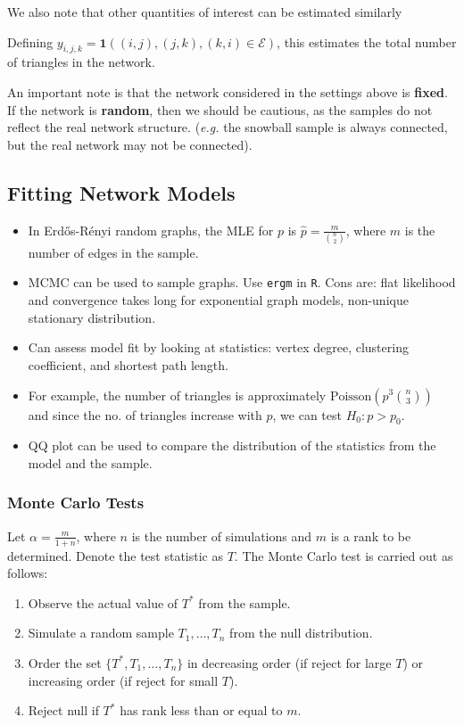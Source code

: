 \documentclass{article}
\begin{document}
We also note that other quantities of interest can be estimated similarly \begin{example}[Triangles]
    Defining $y_{i,j,k}=\mathbf{1}((i,j),(j,k),(k,i)\in \mathcal{E})$, this estimates the total number of triangles in the network.
\end{example}

An important note is that the network considered in the settings above is \textbf{fixed}. If the network is \textbf{random}, then we should be cautious, as the samples do not reflect the real network structure. (\textit{e.g.} the snowball sample is always connected, but the real network may not be connected).  


\subsection{Fitting Network Models}
\begin{itemize}
    \item In Erd\H{o}s-R\'{e}nyi random graphs, the MLE for $p$ is $\hat{p}=\frac{m}{\binom{n}{2}}$, where $m$ is the number of edges in the sample.
    \item MCMC can be used to sample graphs. Use \verb|ergm| in \verb|R|. Cons are: flat likelihood and convergence takes long for exponential graph models, non-unique stationary distribution.
    \item Can assess model fit by looking at statistics: vertex degree, clustering coefficient, and shortest path length.
    \item For example, the number of triangles is approximately $\mathrm{Poisson}(p^3\binom{n}{3})$ and since the no. of triangles increase with $p$, we can test $H_0: p>p_0$. 
    \item QQ plot can be used to compare the distribution of the statistics from the model and the sample.
\end{itemize}

\subsubsection{Monte Carlo Tests} 
Let $\alpha = \frac{m}{1+n}$, where $n$ is the number of simulations and $m$ is a rank to be determined. Denote the test statistic as $T$. The Monte Carlo test is carried out as follows:
\begin{enumerate}
    \item Observe the actual value of $T^*$ from the sample.
    \item Simulate a random sample $T_1, \ldots, T_n$ from the null distribution.
    \item Order the set $\{T^*, T_1, \ldots, T_n\}$ in decreasing order (if reject for large $T$) or increasing order (if reject for small $T$).
    \item Reject null if $T^*$ has rank less than or equal to $m$.
\end{enumerate}
\end{document}
